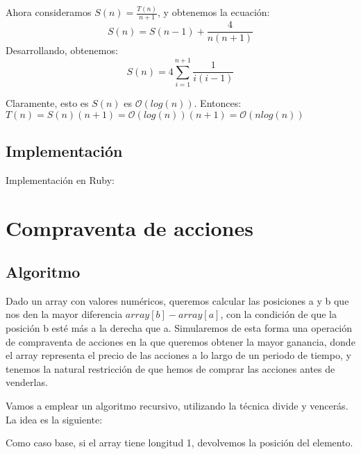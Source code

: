\documentclass[a4paper, 11pt]{article} %
\begin{document}
	  
      Ahora consideramos $S(n) = \frac{T(n)}{n+1}$, y obtenemos la ecuación:
      \begin{equation}
        S(n) = S(n-1) + \frac{4}{n(n+1)}
      \end{equation}
      Desarrollando, obtenemos:
      \begin{equation}
        S(n) = 4 \sum^{n+1}_{i=1} \frac{1}{i(i-1)}
      \end{equation}
      
      Claramente, esto es $S(n)$ es $\mathcal{O}(log(n))$. Entonces: \\
      $T(n) = S(n) (n+1) = \mathcal{O}(log(n)) (n+1) = \mathcal{O}(nlog(n))$

      \subsection{Implementación}
      Implementación en Ruby:

      \small
      \texttt{}
      \normalsize
      
      
\section {Compraventa de acciones}
\subsection{Algoritmo}
	Dado un array con valores numéricos, queremos calcular las posiciones a y b que nos den la mayor diferencia $array[b]-array[a]$, con la condición de que la posición b esté más a la derecha que a.
	Simularemos de esta forma una operación de compraventa de acciones en la que queremos obtener la mayor ganancia, donde el array representa el precio de las acciones a lo largo de un periodo de tiempo, y tenemos la natural restricción de que hemos de comprar las acciones antes de venderlas. 
	
	Vamos a emplear un algoritmo recursivo, utilizando la técnica divide y vencerás. 
	La idea es la siguiente: 
	
	Como caso base, si el array tiene longitud 1, devolvemos la posición del elemento. 
	
\end{document}
